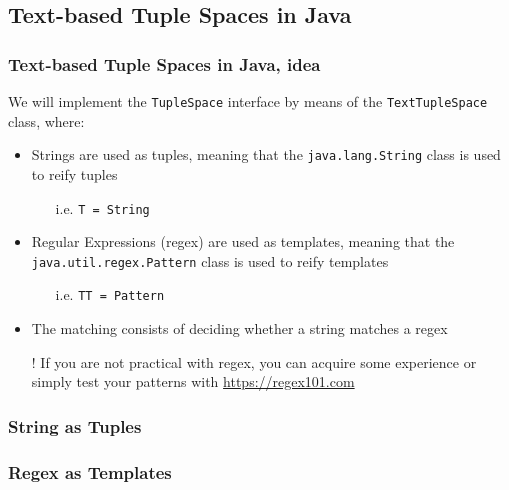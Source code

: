 \documentclass[presentation]{beamer}\mode<presentation>{\usetheme{AMSCesenaPurpleAndGold}}
\begin{document}
\subsection{Text-based Tuple Spaces in Java}

\begin{frame}%
\frametitle{Text-based Tuple Spaces in Java, idea}

We will implement the \texttt{TupleSpace} interface by means of the \texttt{\alert{Text}TupleSpace} class, where:
%
\vfill
%
\begin{itemize}
\item Strings are used as tuples, meaning that the \texttt{java.lang.\alert{String}} class is used to reify tuples
%
\begin{itemize}
\item[i.e.] \texttt{T = String}
\end{itemize}



\item Regular Expressions (regex) are used as templates, meaning that the \texttt{java.util.regex.\alert{Pattern}} class is used to reify templates
%
\begin{itemize}
\item[i.e.] \texttt{TT = Pattern}
\end{itemize}



\item The matching consists of \alert{deciding} whether a string matches a regex

\vfill

\item[!] If you are not practical with regex, you can acquire some experience or simply test your patterns with \url{https://regex101.com}
\end{itemize}

\end{frame}

\begin{frame}
\frametitle{String as Tuples}


%
\end{frame}

\begin{frame}
\frametitle{Regex as Templates}



\end{frame}
\end{document}
